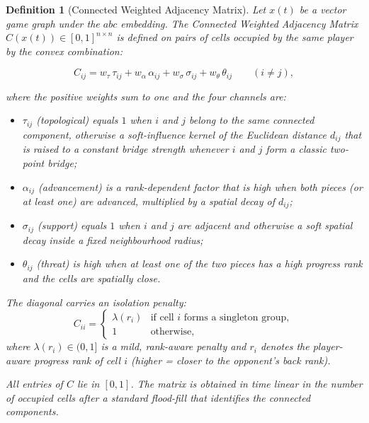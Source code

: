 \documentclass[11pt,a4paper]{article}
\theoremstyle{plain}
\newtheorem{definition}{Definition}[section]
\theoremstyle{definition}
\begin{document}
\begin{definition}[Connected Weighted Adjacency Matrix]
\label{def:connectivity-matrix}
Let \(x(t)\) be a vector game graph under the \(abc\) embedding. The \emph{Connected Weighted Adjacency Matrix} \(C(x(t))\in[0,1]^{n\times n}\) is defined on pairs of cells occupied by the same player by the convex combination:

\vspace{0.5em}

\begin{equation}
C_{ij}
=
w_{\tau}\,\tau_{ij}
+ w_{\alpha}\,\alpha_{ij}
+ w_{\sigma}\,\sigma_{ij}
+ w_{\theta}\,\theta_{ij}
\qquad(i\neq j),
\end{equation}

\vspace{0.5em}

where the positive weights sum to one and the four channels are:

\vspace{0.5em}

\begin{itemize}
\item \(\tau_{ij}\) (topological) equals \(1\) when \(i\) and \(j\) belong to the same connected component, otherwise a soft-influence kernel of the Euclidean distance \(d_{ij}\) that is raised to a constant bridge strength whenever \(i\) and \(j\) form a classic two-point bridge;

\item \(\alpha_{ij}\) (advancement) is a rank-dependent factor that is high when both pieces (or at least one) are advanced, multiplied by a spatial decay of \(d_{ij}\);

\item \(\sigma_{ij}\) (support) equals \(1\) when \(i\) and \(j\) are adjacent and otherwise a soft spatial decay inside a fixed neighbourhood radius;

\item \(\theta_{ij}\) (threat) is high when at least one of the two pieces has a high progress rank and the cells are spatially close.
\end{itemize}

\vspace{0.5em}

The diagonal carries an isolation penalty:
\begin{equation}
C_{ii}
=
\begin{cases}
\lambda(r_i) & \text{if cell \(i\) forms a singleton group},\\
1           & \text{otherwise},
\end{cases}
\end{equation}
where \(\lambda(r_i)\in(0,1]\) is a mild, rank-aware penalty and \(r_i\) denotes the player-aware progress rank of cell \(i\) (higher = closer to the opponent’s back rank).

\vspace{0.5em}

All entries of \(C\) lie in \([0,1]\). The matrix is obtained in time linear in the number of occupied cells after a standard flood-fill that identifies the connected components.
\end{definition}
\end{document}
